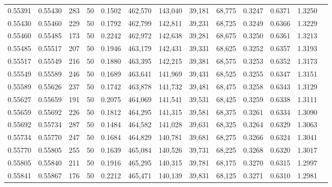 \begin{tabular}{rrrrrrrrrrrrr}
0.55391 & 0.55430 &   283 &  50 &                                     0.1502 & 462,570 & 143,040 &  39,181 &  68,775 & 0.3247 & 0.6371 & 1.3250 \\
0.55430 & 0.55460 &   229 &  50 &                                     0.1792 & 462,799 & 142,811 &  39,231 &  68,725 & 0.3249 & 0.6366 & 1.3229 \\
0.55460 & 0.55485 &   173 &  50 &                                     0.2242 & 462,972 & 142,638 &  39,281 &  68,675 & 0.3250 & 0.6361 & 1.3213 \\
0.55485 & 0.55517 &   207 &  50 &                                     0.1946 & 463,179 & 142,431 &  39,331 &  68,625 & 0.3252 & 0.6357 & 1.3193 \\
0.55517 & 0.55549 &   216 &  50 &                                     0.1880 & 463,395 & 142,215 &  39,381 &  68,575 & 0.3253 & 0.6352 & 1.3173 \\
0.55549 & 0.55589 &   246 &  50 &                                     0.1689 & 463,641 & 141,969 &  39,431 &  68,525 & 0.3255 & 0.6347 & 1.3151 \\
0.55589 & 0.55626 &   237 &  50 &                                     0.1742 & 463,878 & 141,732 &  39,481 &  68,475 & 0.3258 & 0.6343 & 1.3129 \\
0.55627 & 0.55659 &   191 &  50 &                                     0.2075 & 464,069 & 141,541 &  39,531 &  68,425 & 0.3259 & 0.6338 & 1.3111 \\
0.55659 & 0.55692 &   226 &  50 &                                     0.1812 & 464,295 & 141,315 &  39,581 &  68,375 & 0.3261 & 0.6334 & 1.3090 \\
0.55692 & 0.55734 &   287 &  50 &                                     0.1484 & 464,582 & 141,028 &  39,631 &  68,325 & 0.3264 & 0.6329 & 1.3063 \\
0.55734 & 0.55770 &   247 &  50 &                                     0.1684 & 464,829 & 140,781 &  39,681 &  68,275 & 0.3266 & 0.6324 & 1.3041 \\
0.55770 & 0.55805 &   255 &  50 &                                     0.1639 & 465,084 & 140,526 &  39,731 &  68,225 & 0.3268 & 0.6320 & 1.3017 \\
0.55805 & 0.55840 &   211 &  50 &                                     0.1916 & 465,295 & 140,315 &  39,781 &  68,175 & 0.3270 & 0.6315 & 1.2997 \\
0.55841 & 0.55867 &   176 &  50 &                                     0.2212 & 465,471 & 140,139 &  39,831 &  68,125 & 0.3271 & 0.6310 & 1.2981 \\

\end{tabular}
